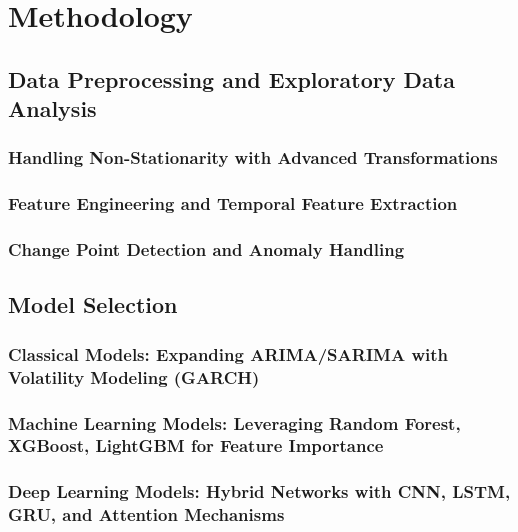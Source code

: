 \chapter{Methodology}

\section{Data Preprocessing and Exploratory Data Analysis} %
\subsection{Handling Non-Stationarity with Advanced Transformations} %

\subsection{Feature Engineering and Temporal Feature Extraction} %

\subsection{Change Point Detection and Anomaly Handling} %

\section{Model Selection} %
\subsection{Classical Models: Expanding ARIMA/SARIMA with Volatility Modeling (GARCH)} %

\subsection{Machine Learning Models: Leveraging Random Forest, XGBoost, LightGBM for Feature Importance} %

\subsection{Deep Learning Models: Hybrid Networks with CNN, LSTM, GRU, and Attention Mechanisms} %

